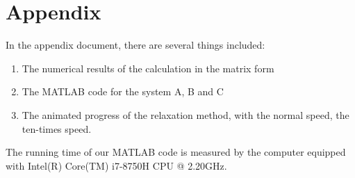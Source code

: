 \documentclass[12pt]{report}
\begin{document}
\section{Appendix}
In the appendix document, there are several things included:
\begin{enumerate}
    \item The numerical results of the calculation in the matrix form
    \item The MATLAB code for the system A, B and C
    \item The animated progress of the relaxation method, with the normal speed, the ten-times speed.
\end{enumerate}
The running time of our MATLAB code is measured by the computer equipped with Intel(R) Core(TM) i7-8750H CPU @ 2.20GHz.
\end{document}
